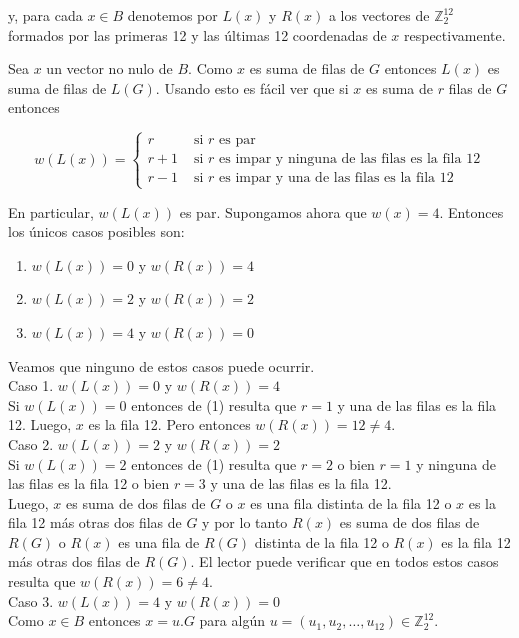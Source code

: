 \documentclass[10pt]{article}
\begin{document}
y, para cada $x \in B$ denotemos por $L(x)$ y $R(x)$ a los vectores de $\mathbb{Z}_{2}^{12}$ formados por las primeras 12 y las últimas 12 coordenadas de $x$ respectivamente.

Sea $x$ un vector no nulo de $B$. Como $x$ es suma de filas de $G$ entonces $L(x)$ es suma de filas de $L(G)$. Usando esto es fácil ver que si $x$ es suma de $r$ filas de $G$ entonces

\[
w(L(x))= \begin{cases}r & \text { si } r \text { es par }  \tag{1}\\ r+1 & \text { si } r \text { es impar y ninguna de las filas es la fila } 12 \\ r-1 & \text { si } r \text { es impar y una de las filas es la fila } 12\end{cases}
\]

En particular, $w(L(x))$ es par. Supongamos ahora que $w(x)=4$. Entonces los únicos casos posibles son:

\begin{enumerate}
  \item $w(L(x))=0$ y $w(R(x))=4$
  \item $w(L(x))=2$ y $w(R(x))=2$
  \item $w(L(x))=4$ y $w(R(x))=0$
\end{enumerate}

Veamos que ninguno de estos casos puede ocurrir.\\
Caso 1. $w(L(x))=0$ y $w(R(x))=4$\\
Si $w(L(x))=0$ entonces de (1) resulta que $r=1$ y una de las filas es la fila 12. Luego, $x$ es la fila 12. Pero entonces $w(R(x))=12 \neq 4$.\\
Caso 2. $w(L(x))=2$ y $w(R(x))=2$\\
Si $w(L(x))=2$ entonces de (1) resulta que $r=2$ o bien $r=1$ y ninguna de las filas es la fila 12 o bien $r=3$ y una de las filas es la fila 12.\\
Luego, $x$ es suma de dos filas de $G$ o $x$ es una fila distinta de la fila 12 o $x$ es la fila 12 más otras dos filas de $G$ y por lo tanto $R(x)$ es suma de dos filas de $R(G)$ o $R(x)$ es una fila de $R(G)$ distinta de la fila 12 o $R(x)$ es la fila 12 más otras dos filas de $R(G)$. El lector puede verificar que en todos estos casos resulta que $w(R(x))=6 \neq 4$.\\
Caso 3. $w(L(x))=4$ y $w(R(x))=0$\\
Como $x \in B$ entonces $x=u . G$ para algún $u=\left(u_{1}, u_{2}, \ldots, u_{12}\right) \in \mathbb{Z}_{2}^{12}$.
\end{document}
